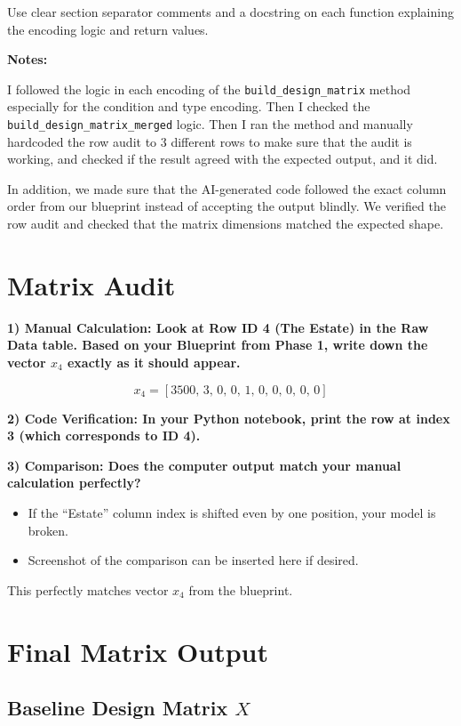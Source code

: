 \documentclass[11pt]{article}
\begin{document}
Use clear section separator comments and a docstring on each function explaining the encoding logic and return values.

\textbf{Notes:}

I followed the logic in each encoding of the \texttt{build\_design\_matrix} method especially for the condition and type encoding. Then I checked the \texttt{build\_design\_matrix\_merged} logic. Then I ran the method and manually hardcoded the row audit to 3 different rows to make sure that the audit is working, and checked if the result agreed with the expected output, and it did.

In addition, we made sure that the AI-generated code followed the exact column order from our blueprint instead of accepting the output blindly. We verified the row audit and checked that the matrix dimensions matched the expected shape.

\section{Matrix Audit}

\textbf{1) Manual Calculation: Look at Row ID 4 (The Estate) in the Raw Data table. Based on your Blueprint from Phase 1, write down the vector $x_4$ exactly as it should appear.}

\[
x_4 = [3500,\, 3,\, 0,\, 0,\, 1,\, 0,\, 0,\, 0,\, 0,\, 0]
\]

\textbf{2) Code Verification: In your Python notebook, print the row at index 3 (which corresponds to ID 4).}

\textbf{3) Comparison: Does the computer output match your manual calculation perfectly?}

\begin{itemize}
    \item If the ``Estate'' column index is shifted even by one position, your model is broken.
    \item Screenshot of the comparison can be inserted here if desired.
\end{itemize}

This perfectly matches vector $x_4$ from the blueprint.

\section{Final Matrix Output}

\subsection*{Baseline Design Matrix $X$}
\end{document}
